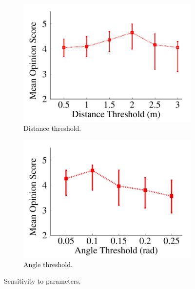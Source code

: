 \begin{figure}[ht]
\centering
  \begin{subfigure}[t]{0.24\textwidth}
    \includegraphics[width=\linewidth]{Figs/RTDrive/evaluation/context_dist.pdf}
    \vspace{-0.5cm}
    \caption{Distance threshold.}
    \label{param_dist}
  \end{subfigure}%
  \begin{subfigure}[t]{0.24\textwidth}
    \includegraphics[width=\linewidth]{Figs/RTDrive/evaluation/context_gyro.pdf}
    \vspace{-0.5cm}
    \caption{Angle threshold.}
    \label{param_angle}
  \end{subfigure}%
  \vspace{-0.2cm}
  \caption{Sensitivity to parameters. }
  \label{parameters}
  \vspace{-0.25cm}
\centering
\end{figure}


